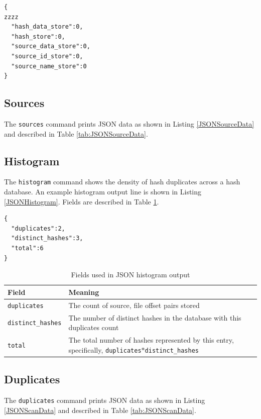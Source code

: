 \documentclass[11pt,fleqn]{article} %
\begin{document}
\lstset{style=customfile}
\begin{lstlisting}[float, caption={Example JSON output of database size values}, label=JSONSize]
{
zzzz
  "hash_data_store":0,
  "hash_store":0,
  "source_data_store":0,
  "source_id_store":0,
  "source_name_store":0
}
\end{lstlisting}

\subsection{Sources}
The \verb+sources+ command prints JSON data as shown in Listing \ref{JSONSourceData} and described in Table \ref{tab:JSONSourceData}.\\

\subsection{Histogram}
The \verb+histogram+ command shows the density of hash duplicates across a hash database.  An example histogram output line is shown in Listing \ref{JSONHistogram}.  Fields are described in Table \ref{tab:JSONHistogram}.\\

\lstset{style=customfile}
\begin{lstlisting}[caption={Example JSON histogram format}, label=JSONHistogram]
{
  "duplicates":2,
  "distinct_hashes":3,
  "total":6
}
\end{lstlisting}

\begin{table}[!ht]

\centering
\caption{Fields used in JSON histogram output}
\label{tab:JSONHistogram}
\begin{tabular}{|p{5 cm}|p{8.8 cm}|}
\hline \hline
\textbf{Field} & \textbf{Meaning} \\
\hline
\verb+duplicates+ & The count of source, file offset pairs stored\\
\hline
\verb+distinct_hashes+ & The number of distinct hashes in the database with this duplicates count\\
\hline
\verb+total+ & The total number of hashes represented by this entry, specifically, \verb+duplicates+$*$\verb+distinct_hashes+\\
\hline
\end{tabular}
\end{table}

\subsection{Duplicates}
The \verb+duplicates+ command prints JSON data as shown in Listing \ref{JSONScanData} and described in Table \ref{tab:JSONScanData}.\\
\end{document}
